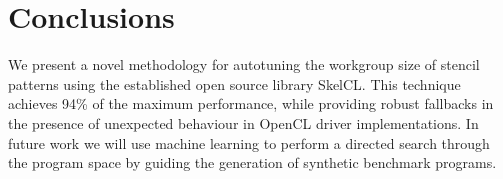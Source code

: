 \documentclass[hidelinks]{acaces}
\begin{document}
\section{Conclusions}

We present a novel methodology for autotuning the workgroup size of
stencil patterns using the established open source library
SkelCL. This technique achieves 94\% of the maximum performance, while
providing robust fallbacks in the presence of unexpected behaviour in
OpenCL driver implementations. In future work we will use machine
learning to perform a directed search through the program space by
guiding the generation of synthetic benchmark programs.


\label{bibliography}

\begingroup
{}
\setlength\bibitemsep{1pt}
\printbibliography
\endgroup
\end{document}
